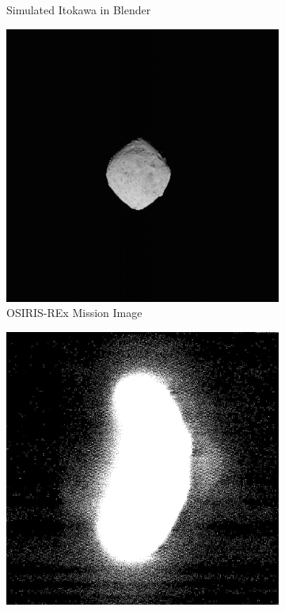 \begin{figure}
\begin{subfigure}{0.23\textwidth}
         \caption{Simulated Itokawa in Blender}
         \label{fig:three sin x}
     \end{subfigure}
     
     \begin{subfigure}{0.23\textwidth}
         \centering
         \includegraphics[width=\textwidth, height = \textwidth]{fig/image_69.png}
         \caption{OSIRIS-REx Mission Image}
         \label{fig:y equals x 2}
     \end{subfigure}
    \hfill
     \begin{subfigure}{0.23\textwidth}
         \centering
         \includegraphics[width=\textwidth, height = \textwidth]{fig/st_2423026558_v.png}

\end{subfigure}
\end{figure}
